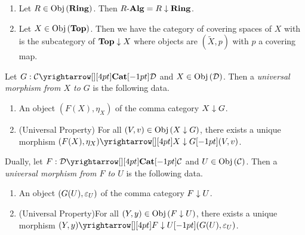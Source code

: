 \begin{eg}
  \begin{enumerate}
    \item Let $R\in\obj{\RING}$. Then $\ALG[R] = R\darrow\RING$.
    \item Let $X\in\obj{\TOP}$. Then we have the category of covering spaces 
    of $X$ with is the subcategory of $\TOP\darrow X$ where 
    objects are $(\tilde{X},p)$ with $p$ a covering map.
  \end{enumerate}
\end{eg}

\begin{dfn}\hypertarget{universal}{}
  
  Let $G : \map{\CC}{\DD}{\CAT}{}$ and $X \in \obj{\DD}$.
  Then a \emph{universal morphism from $X$ to $G$} is the following data. 
  \begin{enumerate}
    \item An object $(F(X),\eta_X)$ of the comma category $X\darrow G$.
    \item (Universal Property) For all $(V,v) \in \obj{X\darrow G}$,
    there exists a unique morphism $\map{(F(X),\eta_X)}{(V,v)}{X\darrow G}{}$.
  \end{enumerate}

  Dually, let $F : \map{\DD}{\CC}{\CAT}{}$ and $U \in \obj{\CC}$.
  Then a \emph{universal morphism from $F$ to $U$} is the following data. 
  \begin{enumerate}
    \item An object $(G(U),\ep_U)$ of the comma category $F\darrow U$.
    \item (Universal Property)For all $(Y,y) \in \obj{F\darrow U}$,
    there exists a unique morphism $\map{(Y,y)}{(G(U),\ep_U)}{F\darrow U}{}$.
  \end{enumerate}
\end{dfn}

